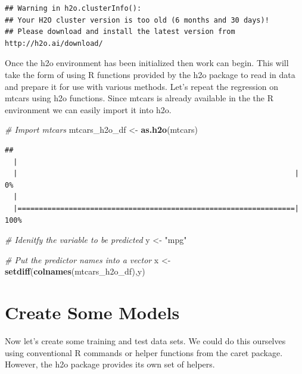 \documentclass[]{book}
\newenvironment{Shaded}{\begin{snugshade}}{\end{snugshade}}
\newcommand{\KeywordTok}[1]{\textcolor[rgb]{0.13,0.29,0.53}{\textbf{#1}}}
\newcommand{\StringTok}[1]{\textcolor[rgb]{0.31,0.60,0.02}{#1}}
\newcommand{\CommentTok}[1]{\textcolor[rgb]{0.56,0.35,0.01}{\textit{#1}}}
\newcommand{\NormalTok}[1]{#1}
\begin{document}
\begin{verbatim}
## Warning in h2o.clusterInfo(): 
## Your H2O cluster version is too old (6 months and 30 days)!
## Please download and install the latest version from http://h2o.ai/download/
\end{verbatim}

Once the h2o environment has been initialized then work can begin. This
will take the form of using R functions provided by the h2o package to
read in data and prepare it for use with various methods. Let's repeat
the regression on mtcars using h2o functions. Since mtcars is already
available in the the R environment we can easily import it into h2o.

\begin{Shaded}
\begin{Highlighting}[]
\CommentTok{# Import mtcars}
\NormalTok{mtcars_h2o_df <-}\StringTok{ }\KeywordTok{as.h2o}\NormalTok{(mtcars)}
\end{Highlighting}
\end{Shaded}

\begin{verbatim}
## 
  |                                                                       
  |                                                                 |   0%
  |                                                                       
  |=================================================================| 100%
\end{verbatim}

\begin{Shaded}
\begin{Highlighting}[]
\CommentTok{# Idenitfy the variable to be predicted}
\NormalTok{y <-}\StringTok{ "mpg"}

\CommentTok{# Put the predictor names into a vector}
\NormalTok{x <-}\StringTok{ }\KeywordTok{setdiff}\NormalTok{(}\KeywordTok{colnames}\NormalTok{(mtcars_h2o_df),y)}
\end{Highlighting}
\end{Shaded}

\section{Create Some Models}\label{create-some-models}

Now let's create some training and test data sets. We could do this
ourselves using conventional R commands or helper functions from the
caret package. However, the h2o package provides its own set of helpers.
\end{document}
